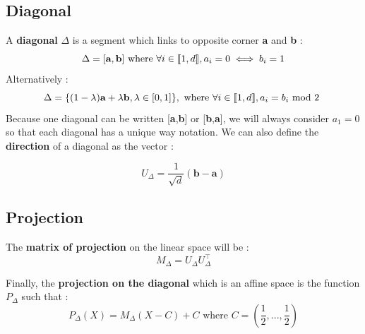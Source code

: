 \documentclass{article}
\begin{document}
	\subsection{Diagonal}	
	
	\begin{definition}
		A \textbf{diagonal} \begin{math} \Delta \end{math} is a segment which links to opposite corner \textbf{a} and \textbf{b} :
		\begin{equation*}
			\Delta =[\textbf{a},\textbf{b}]\text{ where }\newline
			\forall i \in \llbracket 1,d \rrbracket , a_i = 0 \iff b_i=1
		\end{equation*}
			Alternatively :
		\begin{equation*}
			\Delta =\{(1-\lambda)\textbf{a} + \lambda \textbf{b}, \lambda \in [0,1]\}, \text{ where }\newline
			\forall i \in \llbracket 1,d \rrbracket , a_i = b_i\text{ mod 2 }
		\end{equation*}
	Because one diagonal can be written [\textbf{a},\textbf{b}] or [\textbf{b},\textbf{a}], we will always consider \begin{math} a_1 =0 \end{math} so that each diagonal has a unique way notation.\newline
	\newline
	We can also define the \textbf{direction} of a diagonal as the vector :

	\begin{equation*}
		U_\Delta =\frac{1}{\sqrt{d}}(\textbf{b}-\textbf{a})
	\end{equation*}
	\end{definition}	
		
	
   \subsection{Projection}
	
	
	\begin{definition}
	The \textbf{matrix of projection} on the linear space will be :
	\begin{equation*}
		M_\Delta = U_\Delta U_\Delta^\top
	\end{equation*}
	
	Finally, the \textbf{projection on the diagonal} which is an affine space is the function \begin{math} P_\Delta \end{math} such that :
	\begin{equation}
		P_\Delta(X) = M_\Delta(X-C)+C \text{ where } C=(\frac{1}{2},...,\frac{1}{2})
	\end{equation}
	
	
	\end{definition}
	
\end{document}
